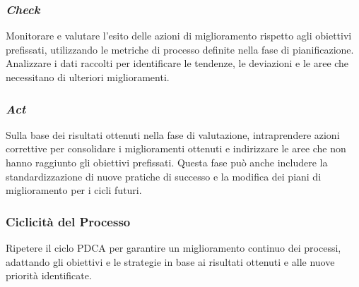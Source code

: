 \subsubsection{\textit{Check}}
	  Monitorare e valutare l'esito delle azioni di miglioramento rispetto
	  agli obiettivi prefissati, utilizzando le metriche di processo
	  definite nella fase di pianificazione. Analizzare i dati raccolti per
	  identificare le tendenze, le deviazioni e le aree che necessitano di
	  ulteriori miglioramenti.

\subsubsection{\textit{Act}}
	  Sulla base dei risultati ottenuti nella fase di valutazione,
	  intraprendere azioni correttive per consolidare i miglioramenti
	  ottenuti e indirizzare le aree che non hanno raggiunto gli obiettivi
	  prefissati. Questa fase può anche includere la standardizzazione di
	  nuove pratiche di successo e la modifica dei piani di miglioramento
	  per i cicli futuri.

\subsubsection{Ciclicità del Processo}
	  Ripetere il ciclo PDCA per garantire un miglioramento continuo dei
	  processi, adattando gli obiettivi e le strategie in base ai risultati
	  ottenuti e alle nuove priorità identificate.

